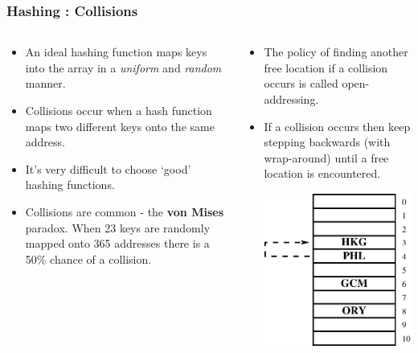 
\begin{frame}[fragile]
\frametitle{Hashing : Collisions}
\begin{columns}[T]

\begin{column}{0.45\textwidth}
\begin{itemize}[<+->]
\item An ideal hashing function maps keys into the array in a {\it uniform} and {\it random} manner.
\item Collisions occur when a hash function maps two different keys onto the same address.
\item It's very difficult to choose `good' hashing functions.
\item Collisions are common - the {\bf von Mises} paradox. When 23 keys are randomly mapped onto 365 addresses there is a 50\% chance of a collision.
\end{itemize}
\end{column}

\pause
\begin{column}{0.45\textwidth}
\begin{itemize}[<+->]
\item The policy of finding another free location if a collision occurs is called open-addressing.
\item If a collision occurs then keep stepping backwards (with wrap-around) until a free location is encountered.
\pause
\begin{center}
\includegraphics[height=0.3333\textheight]{../Images/hashprobe.pdf}
\end{center}
\end{itemize}
\end{column}

\end{columns}
\end{frame}

